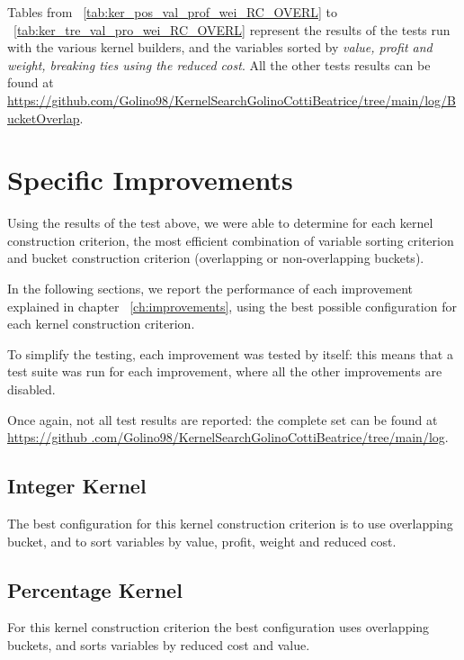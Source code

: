 Tables from ~\ref{tab:ker_pos_val_prof_wei_RC_OVERL} to ~\ref{tab:ker_tre_val_pro_wei_RC_OVERL}
represent the results of the tests run with the various kernel builders,
and the variables sorted by \textit{value, profit and weight, breaking ties using the reduced cost}.
All the other tests results can be found at
\url{https://github.com/Golino98/KernelSearchGolinoCottiBeatrice/tree/main/log/BucketOverlap}.







\section{Specific Improvements}
Using the results of the test above, we were able to determine
for each kernel construction criterion, the most efficient combination of variable sorting criterion and bucket
construction criterion (overlapping or non-overlapping buckets).

In the following sections, we report the performance
of each improvement explained in chapter ~\ref{ch:improvements},
using the best possible configuration for each kernel construction criterion.

To simplify the testing, each improvement was tested by itself: this means that a test suite was run for each
improvement, where all the other improvements are disabled.

Once again, not all test results are reported: the complete set can be found at \url{https://github
.com/Golino98/KernelSearchGolinoCottiBeatrice/tree/main/log}.

\subsection{Integer Kernel}
The best configuration for this kernel construction criterion is to use overlapping bucket,
and to sort variables by value, profit, weight and reduced cost.

\subsection{Percentage Kernel}
For this kernel construction criterion the best configuration uses overlapping buckets,
and sorts variables by reduced cost and value.


